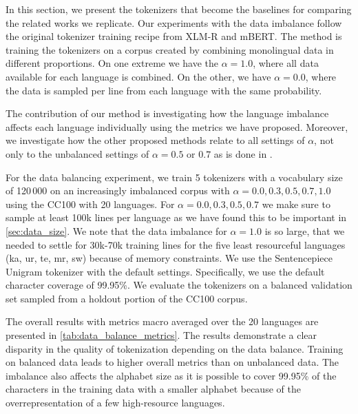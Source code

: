 

In this section, we present the tokenizers that become the baselines for comparing the related works we replicate. Our experiments with the data imbalance follow the original tokenizer training recipe from XLM-R and mBERT. The method is training the tokenizers on a corpus created by combining monolingual data in different proportions. On one extreme we have the $\alpha=1.0$, where all data available for each language is combined. On the other, we have $\alpha=0.0$, where the data is sampled per line from each language with the same probability. 

The contribution of our method is investigating how the language imbalance affects each language individually using the metrics we have proposed. Moreover, we investigate how the other proposed methods relate to all settings of $\alpha$, not only to the unbalanced settings of $\alpha=0.5 \textrm{ or } 0.7$ as is done in \citet{chung_improving_2020,zheng_allocating_2021,liang_xlm-v_2023}.

For the data balancing experiment, we train 5 tokenizers with a vocabulary size of 120\,000 on an increasingly imbalanced corpus with $\alpha = 0.0, 0.3, 0.5, 0.7, 1.0$ using the CC100 with 20 languages. For $\alpha = 0.0, 0.3, 0.5, 0.7$ we make sure to sample at least 100k lines per language as we have found this to be important in \autoref{sec:data_size}. We note that the data imbalance for $\alpha=1.0$ is so large, that we needed to settle for 30k-70k training lines for the five least resourceful languages (ka, ur, te, mr, sw) because of memory constraints. We use the Sentencepiece Unigram tokenizer with the default settings. Specifically, we use the default character coverage of 99.95\%. We evaluate the tokenizers on a balanced validation set sampled from a holdout portion of the CC100 corpus. 

The overall results with metrics macro averaged over the 20 languages are presented in \autoref{tab:data_balance_metrics}. The results demonstrate a clear disparity in the quality of tokenization depending on the data balance. Training on balanced data leads to higher overall metrics than on unbalanced data. The imbalance also affects the alphabet size as it is possible to cover 99.95\% of the characters in the training data with a smaller alphabet because of the overrepresentation of a few high-resource languages.

